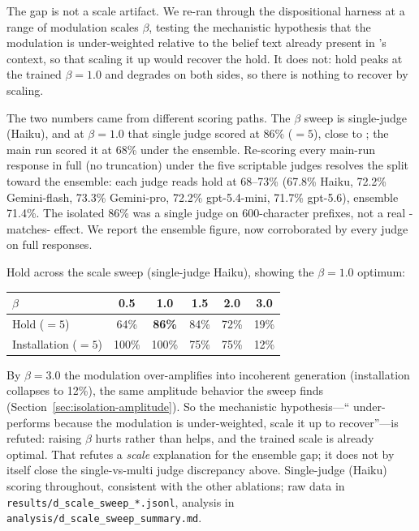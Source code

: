 The gap is not a scale artifact. We re-ran \condD{} through the dispositional harness at a range
of modulation scales \(\beta\), testing the mechanistic hypothesis that the modulation is
under-weighted relative to the belief text already present in \condD{}'s context, so that scaling
it up would recover the hold. It does not: hold peaks at the trained
\(\beta=1.0\) and degrades on both sides, so there is nothing to recover by scaling.

The two numbers came from different scoring paths. The \(\beta\) sweep is single-judge
(Haiku), and at \(\beta=1.0\) that single judge scored \condD{} at 86\% (\(=5\)), close to
\condF{}; the main run scored it at 68\% under the ensemble. Re-scoring every main-run response
in full (no truncation) under the five scriptable judges resolves the split toward the ensemble:
each judge reads \condD{} hold at 68--73\% (67.8\% Haiku, 72.2\% Gemini-flash, 73.3\%
Gemini-pro, 72.2\% gpt-5.4-mini, 71.7\% gpt-5.6), ensemble 71.4\%. The isolated 86\% was a
single judge on 600-character prefixes, not a real \condD{}-matches-\condF{} effect. We report
the ensemble figure, now corroborated by every judge on full responses.

Hold across the scale sweep (single-judge Haiku), showing the \(\beta=1.0\) optimum:

\begin{center}\small
\begin{tabular}{lccccc}
\toprule
\(\beta\) & 0.5 & 1.0 & 1.5 & 2.0 & 3.0 \\
\midrule
Hold (\(=5\)) & 64\% & \textbf{86\%} & 84\% & 72\% & 19\% \\
Installation (\(=5\)) & 100\% & 100\% & 75\% & 75\% & 12\% \\
\bottomrule
\end{tabular}
\end{center}

By \(\beta=3.0\) the modulation over-amplifies into incoherent generation (installation
collapses to 12\%), the same amplitude behavior the \condF{} sweep finds
(Section~\ref{sec:isolation-amplitude}). So the mechanistic hypothesis---``\condD{}
under-performs because the modulation is under-weighted, scale it up to recover''---is refuted:
raising \(\beta\) hurts rather than helps, and the trained scale is already optimal. That refutes
a \emph{scale} explanation for the ensemble gap; it does not by itself close the single-vs-multi
judge discrepancy above. Single-judge (Haiku) scoring throughout, consistent with the other
ablations; raw data in \texttt{results/d\_scale\_sweep\_*.jsonl}, analysis in
\texttt{analysis/d\_scale\_sweep\_summary.md}.


